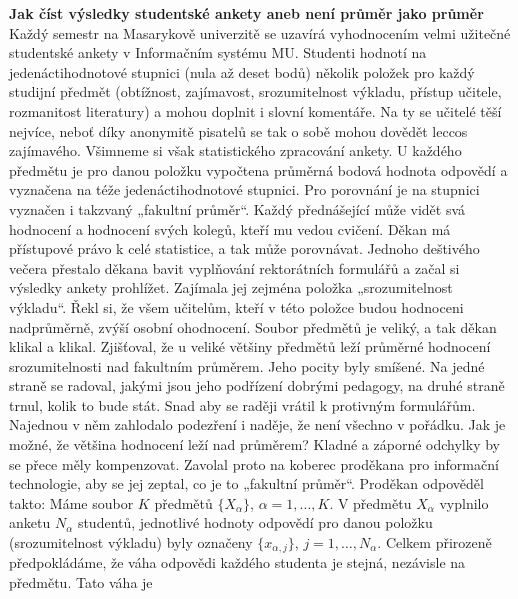 \begin{mdframed}[style=mdexam]
  \begin{example}\label{mai:exam071}
    \textbf{Jak číst výsledky studentské ankety aneb není průměr jako průměr}\newline
    Každý semestr na Masarykově univerzitě se uzavírá vyhodnocením velmi užitečné studentské ankety
    v Informačním systému MU. Studenti hodnotí na jedenáctihodnotové stupnici (nula až deset bodů)
    několik položek pro každý studijní předmět (obtížnost, zajímavost, srozumitelnost výkladu,
    přístup učitele, rozmanitost literatury) a mohou doplnit i slovní komentáře. Na ty se učitelé
    těší nejvíce, neboť díky anonymitě pisatelů se tak o sobě mohou dovědět leccos zajímavého.
    Všimneme si však statistického zpracování ankety. U každého předmětu je pro danou položku
    vypočtena průměrná bodová hodnota odpovědí a vyznačena na téže jedenáctihodnotové stupnici. Pro
    porovnání je na stupnici vyznačen i takzvaný „fakultní průměr“. Každý přednášející může vidět
    svá hodnocení a hodnocení svých kolegů, kteří mu vedou cvičení. Děkan má přístupové právo k celé
    statistice, a tak může porovnávat. Jednoho deštivého večera přestalo děkana bavit vyplňování
    rektorátních formulářů a začal si výsledky ankety prohlížet. Zajímala jej zejména položka
    „srozumitelnost výkladu“. Řekl si, že všem učitelům, kteří v této položce budou hodnoceni
    nadprůměrně, zvýší osobní ohodnocení. Soubor předmětů je veliký, a tak děkan klikal a klikal.
    Zjišťoval, že u veliké většiny předmětů leží průměrné hodnocení srozumitelnosti nad fakultním
    průměrem. Jeho pocity byly smíšené. Na jedné straně se radoval, jakými jsou jeho podřízení
    dobrými pedagogy, na druhé straně trnul, kolik to bude stát. Snad aby se raději vrátil k
    protivným formulářům. Najednou v něm zahlodalo podezření i naděje, že není všechno v pořádku.
    Jak je možné, že většina hodnocení leží nad průměrem? Kladné a záporné odchylky by se přece měly
    kompenzovat. Zavolal proto na koberec proděkana pro informační technologie, aby se jej zeptal,
    co je to „fakultní průměr“. Proděkan odpověděl takto: Máme soubor \(K\) předmětů \(\lbrace
    X_\alpha\rbrace\), \(\alpha = 1, \ldots, K\). V předmětu \(X_\alpha\) vyplnilo anketu
    \(N_\alpha\)  studentů, jednotlivé hodnoty odpovědí pro danou položku (srozumitelnost výkladu)
    byly označeny \(\lbrace x_{\alpha,j}\rbrace\), \(j = 1, \ldots, N_\alpha\). Celkem přirozeně
    předpokládáme, že váha odpovědi každého studenta je stejná, nezávisle na předmětu. Tato váha je

\end{example}
\end{mdframed}
